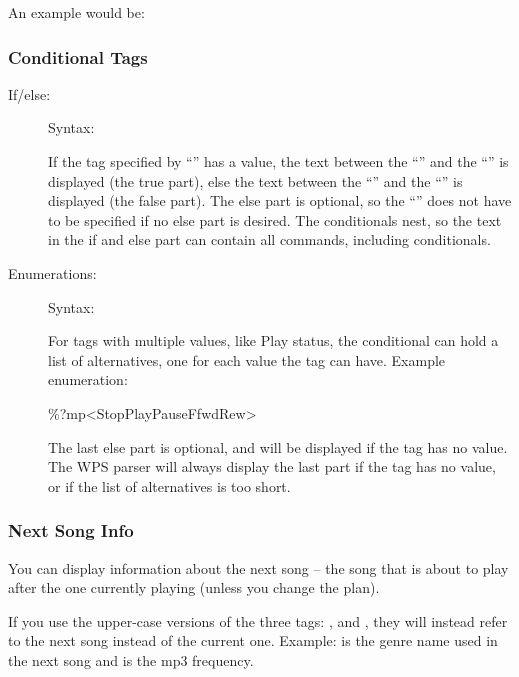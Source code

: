   An example would be: 

\subsubsection{Conditional Tags}

\begin{description}
\item[If/else: ]
Syntax: 

If the tag specified by ``'' has a value, the text between the
``\config{{\textless}}'' and the ``\config{{\textbar}}'' is displayed (the true
part), else the text between the ``\config{{\textbar}}'' and the
``\config{{\textgreater}}'' is displayed (the false part).
The else part is optional, so the ``\config{{\textbar}}'' does not have to be
specified if no else part is desired. The conditionals nest, so the text in the
if and else part can contain all \config{\%} commands, including conditionals.

\item[Enumerations: ]
Syntax: 

For tags with multiple values, like Play status, the conditional can hold a
list of alternatives, one for each value the tag can have.
Example enumeration:
\begin{example}
     \%?mp{\textless}Stop{\textbar}Play{\textbar}Pause{\textbar}Ffwd{\textbar}Rew{\textgreater}
\end{example}

The last else part is optional, and will be displayed if the tag has no value.
The WPS parser will always display the last part if the tag has no value, or if
the list of alternatives is too short.
\end{description}

\subsubsection{Next Song Info}
You can display information about the next song -- the song that is
about to play after the one currently playing (unless you change the
plan).

If you use the upper-case versions of the
three tags: ,  and , they will instead refer to
the next song instead of the current one. Example:  is the genre
name used in the next song and  is the mp3 frequency.\\

